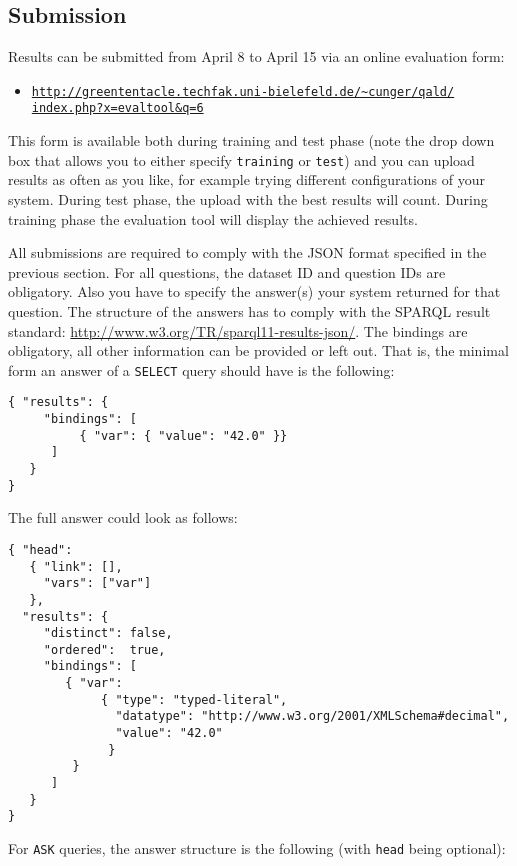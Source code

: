 
\subsection{Submission}

Results can be submitted from April 8 to April 15 via an online evaluation form:
\begin{itemize}
\item[] \href{http://greententacle.techfak.uni-bielefeld.de/~cunger/qald/index.php?x=evaltool&q=6}{\texttt{http://greententacle.techfak.uni-bielefeld.de/\textasciitilde cunger/qald/\\index.php?x=evaltool\&q=6}}
\end{itemize}
This form is available both during training and test phase
(note the drop down box that allows you to either specify {\tt training} or {\tt test})
and you can upload results as often as you like, for example trying different configurations of your system.
During test phase, the upload with the best results will count.
During training phase the evaluation tool will display the achieved results.

All submissions are required to comply with the JSON format specified in the previous section.
For all questions, the dataset ID and question IDs are obligatory.
Also you have to specify the answer(s) your system returned for that question.
The structure of the answers has to comply with the SPARQL result standard: \url{http://www.w3.org/TR/sparql11-results-json/}.
The bindings are obligatory, all other information can be provided or left out.
That is, the minimal form an answer of a \texttt{SELECT} query should have is the following:

\begin{lstlisting}
{ "results": {
     "bindings": [
          { "var": { "value": "42.0" }}
      ]
   }
}
\end{lstlisting}

The full answer could look as follows:

\begin{lstlisting}
{ "head":
   { "link": [],
     "vars": ["var"]
   },
  "results": {
     "distinct": false,
     "ordered":  true,
     "bindings": [
        { "var":
             { "type": "typed-literal",
               "datatype": "http://www.w3.org/2001/XMLSchema#decimal",
               "value": "42.0"
              }
         }
      ]
   }
}
\end{lstlisting}

For \texttt{ASK} queries, the answer structure is the following (with \texttt{head} being optional):

